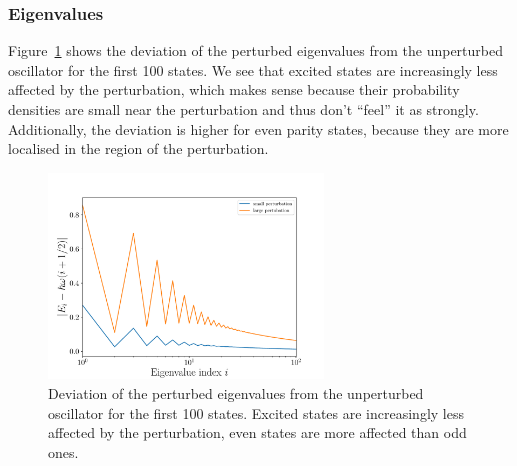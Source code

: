 \documentclass[a4paper,DIV=12,english]{scrartcl}
\begin{document}
\subsubsection{Eigenvalues}
Figure~\ref{fig:evals_bump} shows the deviation of the perturbed eigenvalues from the unperturbed oscillator for the first 100 states. We see that excited states are increasingly less affected by the perturbation, which makes sense because their probability densities are small near the perturbation and thus don't \enquote{feel} it as strongly. Additionally, the deviation is higher for even parity states, because they are more localised in the region of the perturbation.
\begin{figure}
    \centering
    \includegraphics[width=0.65\textwidth]{../plots/evals/evals_bump.pdf}
    \caption{Deviation of the perturbed eigenvalues from the unperturbed oscillator for the first 100 states. Excited states are increasingly less affected by the perturbation, even states are more affected than odd ones.}
    \label{fig:evals_bump}
\end{figure}
\end{document}
